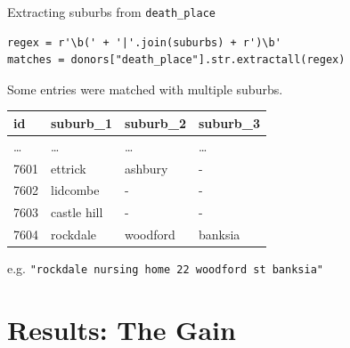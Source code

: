 \documentclass[]{beamer}
\begin{document}
\begin{frame}[fragile]{Extracting suburbs from \texttt{death\_place}}
	\begin{lstlisting}
regex = r'\b(' + '|'.join(suburbs) + r')\b'
matches = donors["death_place"].str.extractall(regex)
	\end{lstlisting}

	Some entries were matched with multiple suburbs.

	\begin{table}[]
		\small
		\begin{tabular}{@{}llll@{}}
		\toprule
		id   & suburb\_1   & suburb\_2 & suburb\_3 \\ \midrule
		\ldots & \ldots	   & \ldots    & \ldots    \\
		7601 & ettrick     & ashbury   & - \\
		7602 & lidcombe    & - & -  \\
		7603 & castle hill & - & - \\
		7604 & rockdale    & woodford  & banksia   \\ \bottomrule
		\end{tabular}
	\end{table}
	e.g. \texttt{"rockdale nursing home 22 woodford st banksia"}
\end{frame}


		


	\section{Results: The Gain}
\end{document}

